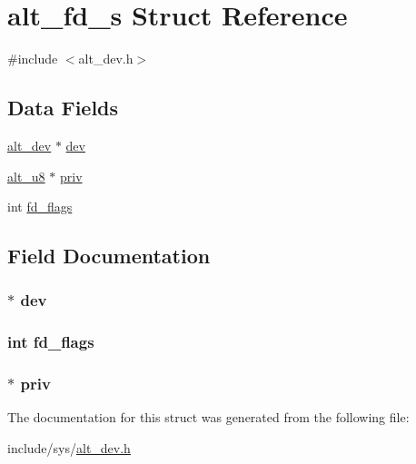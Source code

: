 \hypertarget{structalt__fd__s}{\section{alt\-\_\-fd\-\_\-s \-Struct \-Reference}
\label{structalt__fd__s}
}


{\ttfamily \#include $<$alt\-\_\-dev.\-h$>$}

\subsection*{\-Data \-Fields}
\begin{DoxyCompactItemize}
\item 
\hyperlink{alt__dev_8h_a42830f9d5b32d9ad8d73afa0f24cd56b}{alt\-\_\-dev} $\ast$ \hyperlink{structalt__fd__s_ab54ca34e2eb7dd6c96ae46192fe9acb2}{dev}
\item 
\hyperlink{alt__types_8h_a760207c0ebacdf5df403cdacd6365a6a}{alt\-\_\-u8} $\ast$ \hyperlink{structalt__fd__s_a37387541e7ee40c8f582c4a0a0a6a549}{priv}
\item 
int \hyperlink{structalt__fd__s_ad2dab5b0a54a899f4e7df91cc508dba6}{fd\-\_\-flags}
\end{DoxyCompactItemize}


\subsection{\-Field \-Documentation}
\hypertarget{structalt__fd__s_ab54ca34e2eb7dd6c96ae46192fe9acb2}{
\subsubsection[{dev}]{$\ast$ {\bf dev}}}\label{structalt__fd__s_ab54ca34e2eb7dd6c96ae46192fe9acb2}
\hypertarget{structalt__fd__s_ad2dab5b0a54a899f4e7df91cc508dba6}{
\subsubsection[{fd\-\_\-flags}]{\setlength{\rightskip}{0pt plus 5cm}int {\bf fd\-\_\-flags}}}\label{structalt__fd__s_ad2dab5b0a54a899f4e7df91cc508dba6}
\hypertarget{structalt__fd__s_a37387541e7ee40c8f582c4a0a0a6a549}{
\subsubsection[{priv}]{$\ast$ {\bf priv}}}\label{structalt__fd__s_a37387541e7ee40c8f582c4a0a0a6a549}


\-The documentation for this struct was generated from the following file\-:\begin{DoxyCompactItemize}
\item 
include/sys/\hyperlink{alt__dev_8h}{alt\-\_\-dev.\-h}\end{DoxyCompactItemize}
